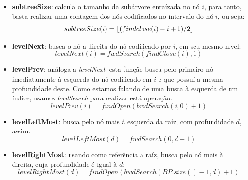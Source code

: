 \begin{itemize}
        \item  \textbf{subtreeSize}: calcula o tamanho da subárvore enraízada no nó $i$, para tanto, basta realizar uma contagem dos nós codificados no intervalo do 
        nó $i$, ou seja:
        $$subtreeSize(i)= \lfloor(findclose(i) - i + 1)/2\rfloor$$
        
        \item \textbf{levelNext}: busca o nó a direita do nó codificado por $i$, em seu mesmo nível:
        $$levelNext(i) = fwdSearch(findClose(i),1)$$
        
        \item \textbf{levelPrev}: análoga a \textit{levelNext}, esta função busca pelo primeiro nó imediatamente à esquerda do nó codificado em $i$ e que possuí a mesma profundidade deste. Como estamos falando de uma busca à esquerda de um índice, usamos \textit{bwdSearch} para realizar está operação:
        $$levelPrev(i) = findOpen(bwdSearch(i,0)+1)$$
        
        \item \textbf{levelLeftMost}: busca pelo nó mais à esquerda da raíz, com profundidade $d$, assim:
        $$levelLeftMost(d) = fwdSearch(0,d-1)$$
        
        \item \textbf{levelRightMost}: usando como referência a raíz, busca pelo nó mais à direita, cuja profundidade é igual  à $d$:
        $$levelRightMost(d) = findOpen(bwdSearch(BP.size()-1,d)+1)$$
    \end{itemize}
    
